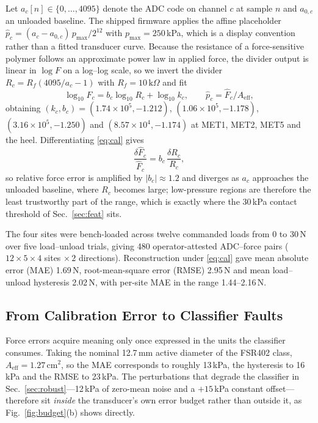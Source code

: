 \documentclass[10pt,conference,a4paper]{IEEEtran}
\begin{document}
Let $a_c[n]\in\{0,\dots,4095\}$ denote the ADC code on channel $c$ at sample
$n$ and $a_{0,c}$ an unloaded baseline. The shipped firmware applies the affine
placeholder $\hat p_c=(a_c-a_{0,c})\,p_{\max}/2^{12}$ with $p_{\max}=250$\,kPa,
which is a display convention rather than a fitted transducer curve. Because
the resistance of a force-sensitive polymer follows an approximate power law in
applied force, the divider output is linear in $\log F$ on a log--log scale, so
we invert the divider $R_c=R_f(4095/a_c-1)$ with $R_f=10\,\mathrm{k}\Omega$ and fit
\begin{equation}
\log_{10} \hat F_c = b_c \log_{10} R_c + \log_{10} k_c,
\qquad \hat p_c = \hat F_c / A_{\mathrm{eff}},
\label{eq:cal}
\end{equation}
obtaining $(k_c,b_c)=(1.74\times10^{5},-1.212)$,
$(1.06\times10^{5},-1.178)$,
$(3.16\times10^{5},-1.250)$ and
$(8.57\times10^{4},-1.174)$ at MET1, MET2, MET5 and the heel.
Differentiating \eqref{eq:cal} gives
\begin{equation}
\frac{\delta \hat F_c}{\hat F_c}
   = b_c\,\frac{\delta R_c}{R_c},
\label{eq:sens}
\end{equation}
so relative force error is amplified by $|b_c|\approx 1.2$ and diverges as
$a_c$ approaches the unloaded baseline, where $R_c$ becomes large; low-pressure
regions are therefore the least trustworthy part of the range, which is exactly
where the 30\,kPa contact threshold of Sec.~\ref{sec:feat} sits.

The four sites were bench-loaded across twelve commanded loads from 0 to
30\,N over five load--unload trials, giving 480 operator-attested ADC--force
pairs ($12\times5\times4$ sites $\times\,2$ directions). Reconstruction under
\eqref{eq:cal} gave mean absolute error (MAE) 1.69\,N, root-mean-square error
(RMSE) 2.95\,N and mean load--unload hysteresis 2.02\,N, with per-site MAE in
the range 1.44--2.16\,N.

\subsection{From Calibration Error to Classifier Faults}
\label{sec:budget}

Force errors acquire meaning only once expressed in the units the classifier
consumes. Taking the nominal 12.7\,mm active diameter of the FSR402 class,
$A_{\mathrm{eff}}=1.27$\,cm$^2$, so the MAE corresponds to roughly 13\,kPa, the
hysteresis to 16\,kPa and the RMSE to 23\,kPa. The perturbations that degrade
the classifier in Sec.~\ref{sec:robust}---12\,kPa of zero-mean noise and a
$+15$\,kPa constant offset---therefore sit \emph{inside} the transducer's own
error budget rather than outside it, as Fig.~\ref{fig:budget}(b) shows
directly.
\end{document}
